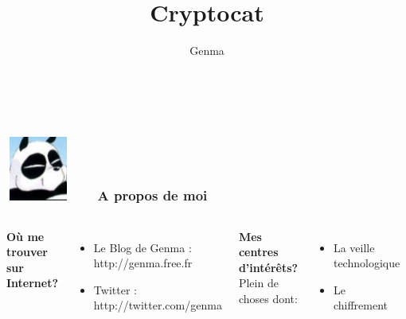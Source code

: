 \documentclass{beamer}
\title[Cryptocat]{Cryptocat}
\author{Genma}
\begin{document}
\begin{frame}
	\titlepage
	\vfill
	\begin{center}
		\\[2.5ex]
		{\tiny\CcNote{\CcLongnameByNcSa}}
		\vspace*{-2.5ex}
	\end{center}
\end{frame}

\begin{frame}
\frametitle{\includegraphics[scale=0.4]{./images/Genma.jpg} \ \ \  A propos de moi  }
\begin{columns}[c] 

\textbf{Où me trouver sur Internet?}
\begin{itemize}
\item Le Blog de Genma : http://genma.free.fr
\item Twitter : http://twitter.com/genma
\end{itemize}

\textbf{Mes centres d'intérêts?}
\\ Plein de choses dont:
\begin{itemize}
\item La veille technologique
\item Le chiffrement
\end{itemize}
\includegraphics[width=5cm,height=5cm]{./images/blog.png} 
\end{columns}
\end{frame}
\end{document}
